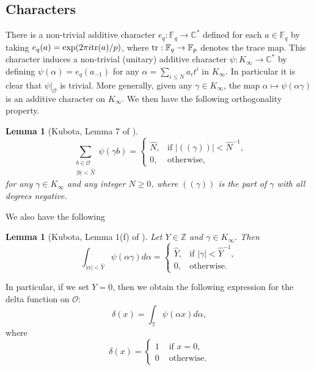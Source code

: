\documentclass[11pt]{amsart}
\theoremstyle{plain}
\theoremstyle{plain}
\newtheorem{lemma}[theorem]{Lemma}
\theoremstyle{remark}
\theoremstyle{definition}
\newcommand{\tr}{\textup{tr}}
\renewcommand{\hat}{\widehat}
\newcommand{\Ki}{K_\infty}
\newcommand{\ki}{K_\infty}
\newcommand{\FF}{\mathbb{F}}
\newcommand{\ZZ}{\mathbb{Z}}
\newcommand{\CC}{\mathbb{C}}
\newcommand{\TT}{\mathbb{T}}
\newcommand{\cO}{\mathcal{O}}
\begin{document}
\subsection{Characters}\label{s:add-characters}
There is a non-trivial additive character $e_q:\FF_q\rightarrow \CC^*$ defined
for each $a\in \FF_q$ by taking 
$e_q(a)=\exp(2\pi i \tr(a)/p)$, where $\tr: \FF_q\rightarrow \FF_p$ denotes the
trace map.
This character induces a non-trivial (unitary) additive character $\psi:
K_\infty\rightarrow \CC^*$ by defining $\psi(\alpha)=e_q(a_{-1})$ for any 
$\alpha=\sum_{i\leq N}a_i t^i$ in $\Ki$. In particular it is clear that
$\psi|_\cO$ is trivial. 
More generally, given any $\gamma \in \Ki$, the map $\alpha\mapsto \psi(\alpha\gamma)$ is an additive
character on $\Ki$. We then have the following orthogonality property.
\begin{lemma}[Kubota, Lemma 7 of
\cite{kubota}]\label{lem:orthogsum}
$$
\sum_{\substack{b\in \cO\\ |b|<\hat N}}\psi(\gamma b)=\begin{cases}
\hat N, & \mbox{if $|(\!(\gamma)\!)|<\hat N^{-1}$,}\\
0, & \mbox{otherwise},
\end{cases}
$$
for any $\gamma \in \ki$ and any integer $N\geq 0$, where $(\!(\gamma)\!)$ is the part of $\gamma$ with all degrees negative.
\end{lemma}
We also have the following
\begin{lemma}[Kubota, Lemma 1(f) of \cite{kubota}]\label{lem:orthog}
Let $Y\in \ZZ$ and $\gamma\in  \ki$. Then 
$$
\int_{|\alpha|<\hat{Y}} \psi(\alpha \gamma) d \alpha=\begin{cases}
\hat Y, &\mbox{if $|\gamma|<\hat Y^{-1}$},\\
0, &\mbox{otherwise.}
\end{cases}
$$
\end{lemma}
In particular, if we set $Y=0$, then we obtain the following expression for the delta function on $\mathcal{O}$:
\[\delta(x)=\int_{\TT}\psi(\alpha x)d\alpha,\]
where 
\[
\delta(x)=\begin{cases} 1 &\text{ if } x=0,\\ 0 &\text{ otherwise.}  \end{cases}
\]
\end{document}
